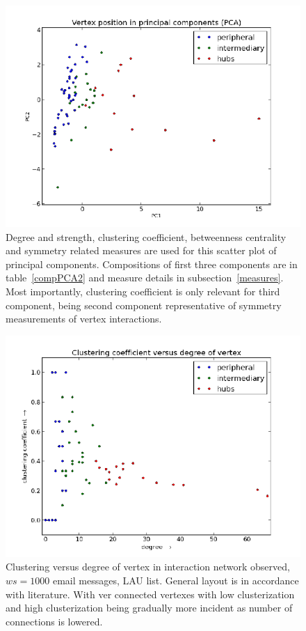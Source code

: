 \documentclass[%
 aip,
 jmp,%
 amsmath,amssymb,
 reprint,%
]{revtex4-1}
\begin{document}
\begin{figure} 
   \centering
        \includegraphics[width=\columnwidth]{figs/ev0pr1PCA}
    \caption{Degree and strength, clustering coefficient, betweenness centrality and symmetry related measures are used for this scatter plot of principal components. Compositions of first three components are in table~\ref{compPCA2} and measure details in subsection~\ref{measures}. Most importantly, clustering coefficient is only relevant for third component, being second component representative of symmetry measurements of vertex interactions.}
    \label{PCA2}
\end{figure}


\begin{figure} 
   \centering
        \includegraphics[width=\columnwidth]{figs/ev0pr11CC}
    \caption{Clustering versus degree of vertex in interaction network observed, $ws = 1000$ email messages, LAU list. General layout is in accordance with literature. With ver connected vertexes with low clusterization and high clusterization being gradually more incident as number of connections is lowered.}
    \label{clust}
\end{figure}
\end{document}

